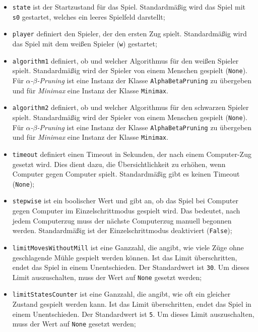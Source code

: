 \documentclass[11pt]{article}
\providecommand{\tightlist}{%
      \setlength{\itemsep}{0pt}\setlength{\parskip}{0pt}}
\begin{document}
\begin{itemize}
\tightlist
\item
  \texttt{state} ist der Startzustand für das Spiel. Standardmäßig wird
  das Spiel mit \texttt{s0} gestartet, welches ein leeres Spielfeld
  darstellt;
\item
  \texttt{player} definiert den Spieler, der den ersten Zug spielt.
  Standardmäßig wird das Spiel mit dem weißen Spieler (\texttt{w})
  gestartet;
\item
  \texttt{algorithm1} definiert, ob und welcher Algorithmus für den
  weißen Spieler spielt. Standardmäßig wird der Spieler von einem
  Menschen gespielt (\texttt{None}). Für \emph{$\alpha$-$\beta$-Pruning} ist eine
  Instanz der Klasse \texttt{AlphaBetaPruning} zu übergeben und für
  \emph{Minimax} eine Instanz der Klasse \texttt{Minimax}.
\item
  \texttt{algorithm2} definiert, ob und welcher Algorithmus für den
  schwarzen Spieler spielt. Standardmäßig wird der Spieler von einem
  Menschen gespielt (\texttt{None}). Für \emph{$\alpha$-$\beta$-Pruning} ist eine
  Instanz der Klasse \texttt{AlphaBetaPruning} zu übergeben und für
  \emph{Minimax} eine Instanz der Klasse \texttt{Minimax}.
\item
  \texttt{timeout} definiert einen Timeout in Sekunden, der nach einem
  Computer-Zug gesetzt wird. Dies dient dazu, die Übersichtlichkeit zu
  erhöhen, wenn Computer gegen Computer spielt. Standardmäßig gibt es
  keinen Timeout (\texttt{None});
\item
  \texttt{stepwise} ist ein boolischer Wert und gibt an, ob das Spiel
  bei Computer gegen Computer im Einzelschrittmodus gespielt wird. Das
  bedeutet, nach jedem Computerzug muss der nächste Computerzug manuell
  begonnen werden. Standardmäßig ist der Einzelschrittmodus deaktiviert
  (\texttt{False});
\item
  \texttt{limitMovesWithoutMill} ist eine Ganzzahl, die angibt, wie
  viele Züge ohne geschlagende Mühle gespielt werden können. Ist das
  Limit überschritten, endet das Spiel in einem Unentschieden. Der
  Standardwert ist \texttt{30}. Um dieses Limit auszuschalten, muss der
  Wert auf \texttt{None} gesetzt werden;
\item
  \texttt{limitStatesCounter} ist eine Ganzzahl, die angibt, wie oft ein
  gleicher Zustand gespielt werden kann. Ist das Limit überschritten,
  endet das Spiel in einem Unentschieden. Der Standardwert ist
  \texttt{5}. Um dieses Limit auszuschalten, muss der Wert auf
  \texttt{None} gesetzt werden;
\end{itemize}
\end{document}
